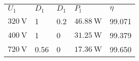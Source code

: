 \begin{table}[ht]
    \centering  %
    \begin{tabular}{lllll}
        \toprule
        
        $U_\mathrm{1}$ & $D_1$   & $D_1$ & $P_\mathrm{l}$      & $\eta$ \\ 
        $\SI{320}{\volt}$ & 1    & 0.2   & $\SI{46.88}{\watt}$ & 99.071 \\ 
        $\SI{400}{\volt}$ & 1    & 0     & $\SI{31.25}{\watt}$ & 99.379 \\ 
        $\SI{720}{\volt}$ & 0.56 & 0     & $\SI{17.36}{\watt}$ & 99.650 \\ 
        \bottomrule
    \end{tabular}
\end{table}
